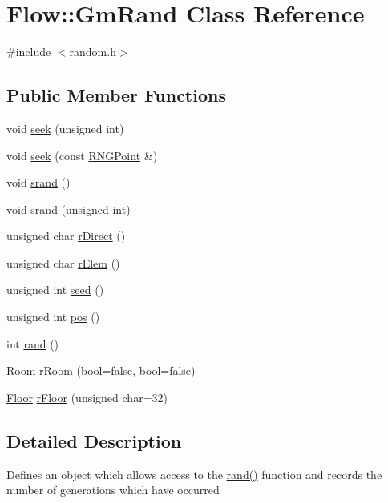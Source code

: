 \hypertarget{class_flow_1_1_gm_rand}{}\section{Flow\+:\+:Gm\+Rand Class Reference}
\label{class_flow_1_1_gm_rand}


{\ttfamily \#include $<$random.\+h$>$}

\subsection*{Public Member Functions}
\begin{DoxyCompactItemize}
\item 
void \hyperlink{class_flow_1_1_gm_rand_a109fe067556f62419afe48f11048acf5}{seek} (unsigned int)
\item 
void \hyperlink{class_flow_1_1_gm_rand_a75eb20ea46c459b53793960e711dd81c}{seek} (const \hyperlink{struct_flow_1_1_r_n_g_point}{R\+N\+G\+Point} \&)
\item 
void \hyperlink{class_flow_1_1_gm_rand_aadd656b294e8e7330ba408486646e2f3}{srand} ()
\item 
void \hyperlink{class_flow_1_1_gm_rand_abc8aefeb9e15a414964e6e9b0665a8e7}{srand} (unsigned int)
\item 
unsigned char \hyperlink{class_flow_1_1_gm_rand_aeb38e9d08aae7a5d4788facf408b01dc}{r\+Direct} ()
\item 
unsigned char \hyperlink{class_flow_1_1_gm_rand_a7df923fe60c18e20a157de7aa599f533}{r\+Elem} ()
\item 
unsigned int \hyperlink{class_flow_1_1_gm_rand_a8a8b7dafe3991717c68beb1f13409f77}{seed} ()
\item 
unsigned int \hyperlink{class_flow_1_1_gm_rand_aef1a411df95f3d49a7180fbcd9d432c1}{pos} ()
\item 
int \hyperlink{class_flow_1_1_gm_rand_a638c37993080f31a9857d11c284c15b5}{rand} ()
\item 
\hyperlink{class_flow_1_1_room}{Room} \hyperlink{class_flow_1_1_gm_rand_a8a978d8967082e7e519996204c29eb9d}{r\+Room} (bool=false, bool=false)
\item 
\hyperlink{class_flow_1_1_floor}{Floor} \hyperlink{class_flow_1_1_gm_rand_a9ca568e62a941c10e42bedb3e334ed52}{r\+Floor} (unsigned char=32)
\end{DoxyCompactItemize}


\subsection{Detailed Description}
Defines an object which allows access to the \hyperlink{class_flow_1_1_gm_rand_a638c37993080f31a9857d11c284c15b5}{rand()} function and records the number of generations which have occurred 

